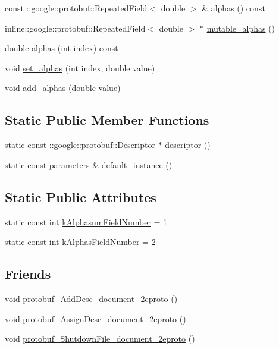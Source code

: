 \begin{DoxyCompactItemize}
\item 
const ::google::protobuf::RepeatedField$<$ double $>$ \& \hyperlink{class_l_d_a_1_1parameters_a6a52f0323ff62c46382a4ca50985f9ba}{alphas} () const 
\item 
inline::google::protobuf::RepeatedField$<$ double $>$ $\ast$ \hyperlink{class_l_d_a_1_1parameters_a1d1708304e2ead9d68e03e663d219f63}{mutable\_\-alphas} ()
\item 
double \hyperlink{class_l_d_a_1_1parameters_aaac9dfc262ea17a6e4b83ebf9488f055}{alphas} (int index) const 
\item 
void \hyperlink{class_l_d_a_1_1parameters_a69cbcd0794eb6f3fde429705cbab8866}{set\_\-alphas} (int index, double value)
\item 
void \hyperlink{class_l_d_a_1_1parameters_acc255b8e5e148ae8f39c3f3a0ecf4e40}{add\_\-alphas} (double value)
\end{DoxyCompactItemize}
\subsection*{Static Public Member Functions}
\begin{DoxyCompactItemize}
\item 
static const ::google::protobuf::Descriptor $\ast$ \hyperlink{class_l_d_a_1_1parameters_a6d42cf2ca9506e1ef58d9545f029a6d1}{descriptor} ()
\item 
static const \hyperlink{class_l_d_a_1_1parameters}{parameters} \& \hyperlink{class_l_d_a_1_1parameters_a9ad0369f1bc7da1c4bd9583063fd2460}{default\_\-instance} ()
\end{DoxyCompactItemize}
\subsection*{Static Public Attributes}
\begin{DoxyCompactItemize}
\item 
static const int \hyperlink{class_l_d_a_1_1parameters_a856a5e02027c251c5616752013231231}{kAlphasumFieldNumber} = 1
\item 
static const int \hyperlink{class_l_d_a_1_1parameters_a6a022362d3d9f338b2931e15dc0083e5}{kAlphasFieldNumber} = 2
\end{DoxyCompactItemize}
\subsection*{Friends}
\begin{DoxyCompactItemize}
\item 
void \hyperlink{class_l_d_a_1_1parameters_a9ca7998089dddfe828221d1f41bf4f9c}{protobuf\_\-AddDesc\_\-document\_\-2eproto} ()
\item 
void \hyperlink{class_l_d_a_1_1parameters_a5c1ac521cee58e6270c99a8c012c8950}{protobuf\_\-AssignDesc\_\-document\_\-2eproto} ()
\item 
void \hyperlink{class_l_d_a_1_1parameters_af79773dc456499799fb950f62b8cd291}{protobuf\_\-ShutdownFile\_\-document\_\-2eproto} ()
\end{DoxyCompactItemize}


